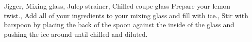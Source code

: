 \documentclass[../main.tex]{subfiles}
\begin{document}
\clearpage
{}

%
{Jigger, Mixing glass, Julep strainer, Chilled coupe glass}
%
{
	Prepare your lemon twist.,
	Add all of your ingredients to your mixing glass and fill with ice.,
	Stir with barspoon by placing the back of the spoon against the inside of the glass and pushing the ice around until chilled and diluted.
}

%
%




%
\end{document}
